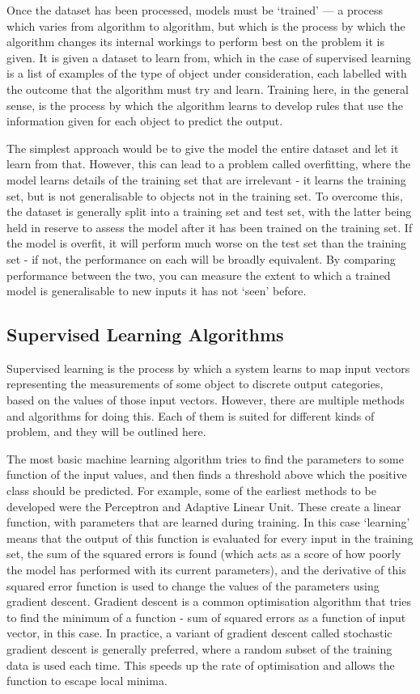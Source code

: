 Once the dataset has been processed, models must be `trained' --- a process which varies from algorithm to algorithm, but which is the process by which the algorithm changes its internal workings to perform best on the problem it is given. It is given a dataset to learn from, which in the case of supervised learning is a list of examples of the type of object under consideration, each labelled with the outcome that the algorithm must try and learn. Training here, in the general sense, is the process by which the algorithm learns to develop rules that use the information given for each object to predict the output.

The simplest approach would be to give the model the entire dataset and let it learn from that. However, this can lead to a problem called overfitting, where the model learns details of the training set that are irrelevant - it learns the training set, but is not generalisable to objects not in the training set. To overcome this, the dataset is generally split into a training set and test set, with the latter being held in reserve to assess the model after it has been trained on the training set. If the model is overfit, it will perform much worse on the test set than the training set - if not, the performance on each will be broadly equivalent. By comparing performance between the two, you can measure the extent to which a trained model is generalisable to new inputs it has not `seen' before.

\subsection{Supervised Learning Algorithms}

Supervised learning is the process by which a system learns to map input vectors representing the measurements of some object to discrete output categories, based on the values of those input vectors. However, there are multiple methods and algorithms for doing this. Each of them is suited for different kinds of problem, and they will be outlined here.

The most basic machine learning algorithm tries to find the parameters to some function of the input values, and then finds a threshold above which the positive class should be predicted. For example, some of the earliest methods to be developed were the Perceptron and Adaptive Linear Unit. These create a linear function, with parameters that are learned during training. In this case `learning' means that the output of this function is evaluated for every input in the training set, the sum of the squared errors is found (which acts as a score of how poorly the model has performed with its current parameters), and the derivative of this squared error function is used to change the values of the parameters using gradient descent. Gradient descent is a common optimisation algorithm that tries to find the minimum of a function - sum of squared errors as a function of input vector, in this case. In practice, a variant of gradient descent called stochastic gradient descent is generally preferred, where a random subset of the training data is used each time. This speeds up the rate of optimisation and allows the function to escape local minima.


